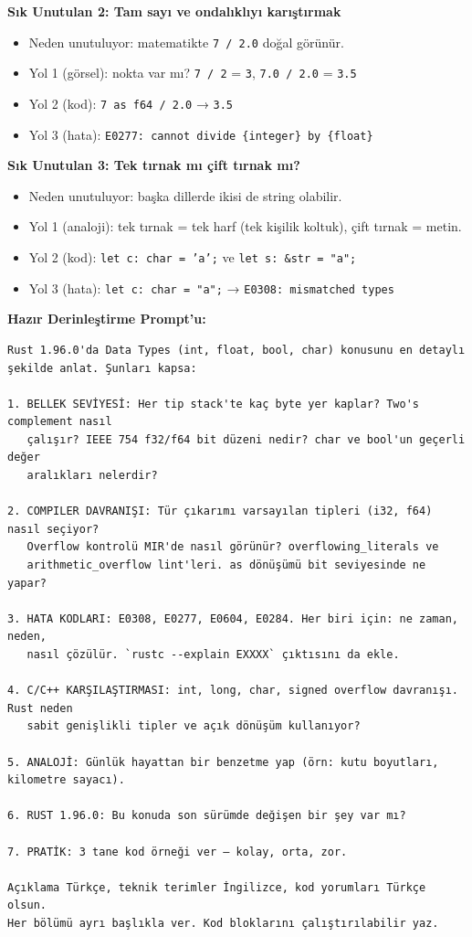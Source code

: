 \documentclass[12pt,a4paper]{article}
\begin{document}
\textbf{Sık Unutulan 2: Tam sayı ve ondalıklıyı karıştırmak}

\begin{itemize}
\tightlist
\item
  Neden unutuluyor: matematikte \texttt{7\ /\ 2.0} doğal görünür.
\item
  Yol 1 (görsel): nokta var mı? \texttt{7\ /\ 2} = \texttt{3}, \texttt{7.0\ /\ 2.0} = \texttt{3.5}
\item
  Yol 2 (kod): \texttt{7\ as\ f64\ /\ 2.0} → \texttt{3.5}
\item
  Yol 3 (hata): \texttt{E0277:\ cannot\ divide\ \{integer\}\ by\ \{float\}}
\end{itemize}

\textbf{Sık Unutulan 3: Tek tırnak mı çift tırnak mı?}

\begin{itemize}
\tightlist
\item
  Neden unutuluyor: başka dillerde ikisi de string olabilir.
\item
  Yol 1 (analoji): tek tırnak = tek harf (tek kişilik koltuk), çift tırnak = metin.
\item
  Yol 2 (kod): \texttt{let\ c:\ char\ =\ 'a';} ve \texttt{let\ s:\ \&str\ =\ "a";}
\item
  Yol 3 (hata): \texttt{let\ c:\ char\ =\ "a";} → \texttt{E0308:\ mismatched\ types}
\end{itemize}

\textbf{Hazır Derinleştirme Prompt'u:}

\begin{verbatim}
Rust 1.96.0'da Data Types (int, float, bool, char) konusunu en detaylı şekilde anlat. Şunları kapsa:

1. BELLEK SEVİYESİ: Her tip stack'te kaç byte yer kaplar? Two's complement nasıl
   çalışır? IEEE 754 f32/f64 bit düzeni nedir? char ve bool'un geçerli değer
   aralıkları nelerdir?

2. COMPILER DAVRANIŞI: Tür çıkarımı varsayılan tipleri (i32, f64) nasıl seçiyor?
   Overflow kontrolü MIR'de nasıl görünür? overflowing_literals ve
   arithmetic_overflow lint'leri. as dönüşümü bit seviyesinde ne yapar?

3. HATA KODLARI: E0308, E0277, E0604, E0284. Her biri için: ne zaman, neden,
   nasıl çözülür. `rustc --explain EXXXX` çıktısını da ekle.

4. C/C++ KARŞILAŞTIRMASI: int, long, char, signed overflow davranışı. Rust neden
   sabit genişlikli tipler ve açık dönüşüm kullanıyor?

5. ANALOJİ: Günlük hayattan bir benzetme yap (örn: kutu boyutları, kilometre sayacı).

6. RUST 1.96.0: Bu konuda son sürümde değişen bir şey var mı?

7. PRATİK: 3 tane kod örneği ver — kolay, orta, zor.

Açıklama Türkçe, teknik terimler İngilizce, kod yorumları Türkçe olsun.
Her bölümü ayrı başlıkla ver. Kod bloklarını çalıştırılabilir yaz.
\end{verbatim}
\end{document}
